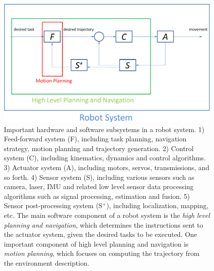 \begin{figure}[!htb]
  \centering
  \includegraphics[width=\linewidth]{figs/1/pipeline-crop.pdf}
  \caption[Important hardware and software subsystems in a robot system]{Important hardware and software subsystems in a robot system. 1) Feed-forward system (F), including task planning, navigation strategy, motion planning and trajectory generation. 2) Control system (C), including kinematics, dynamics and control algorithms. 3) Actuator system (A), including motors, servos, transmissions, and so forth. 4) Sensor system (S), including various sensors such as camera, laser, IMU and related low level sensor data processing algorithms such as signal processing, estimation and fusion. 5) Sensor post-processing system (S$^+$), including localization, mapping, etc. The main software component of a robot system is the \emph{high level planning and navigation}, which determines the instructions sent to the actuator system, given the desired tasks to be executed. One important component of high level planning and navigation is \emph{motion planning}, which focuses on computing the trajectory from the environment description.}
  \label{fig:1:pipeline}
\end{figure}

